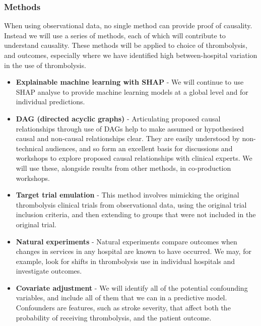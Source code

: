 \subsubsection{Methods}

When using observational data, no single method can provide proof of causality. Instead we will use a series of methods, each of which will contribute to understand causality. These methods will be applied to choice of thrombolysis, and outcomes, especially where we have identified high between-hospital variation in the use of thrombolysis. 

\begin{itemize}

    \item \textbf{Explainable machine learning with SHAP} \cite{aas_explaining_2020} - We will continue to use SHAP analyse to provide machine learning models at a global level and for individual predictions.

    \item \textbf{DAG (directed acyclic graphs)} \cite{tennant_use_2021} - Articulating proposed causal relationships through use of DAGs help to make assumed or hypothesised causal and non-causal relationships clear. They are easily understood by non-technical audiences, and so form an excellent basis for discussions and workshops to explore proposed causal relationships with clinical experts. We will use these, alongside results from other methods, in co-production workshops.
    
    \item \textbf{Target trial emulation} \cite{bigirumurame_current_2023} - This method involves mimicking the original thrombolysis clinical trials from observational data, using the original trial inclusion criteria, and then extending to groups that were not included in the original trial.

    \item \textbf{Natural experiments} \cite{craig_natural_2017} - Natural experiments compare outcomes when changes in services in any hospital are known to have occurred. We may, for example, look for shifts in thrombolysis use in individual hospitals and investigate outcomes.

    \item \textbf{Covariate adjustment} \cite{igelstrom_causal_2022} - We will identify all of the potential confounding variables, and include all of them that we can in a predictive model. Confounders are features, such as stroke severity, that affect both the probability of receiving thrombolysis, and the patient outcome. 


\end{itemize}
